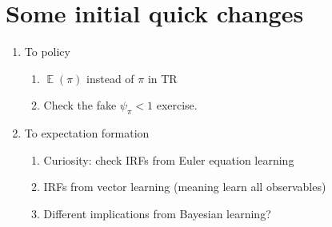 \documentclass[11pt]{article}
\renewcommand{\[}{\begin{equation}}
\renewcommand{\]}{\end{equation}}
\DeclareMathOperator{\E}{\mathbb{E}}
\begin{document}
\section{Some initial quick changes}\label{changes}
\begin{enumerate}
\item To policy
\begin{enumerate}
\item $\E(\pi)$ instead of $\pi$ in TR
\item Check the fake $\psi_{\pi} < 1$ exercise.
\end{enumerate}
\item To expectation formation
\begin{enumerate}
\item Curiosity: check IRFs from Euler equation learning
\item IRFs from vector learning (meaning learn all observables)
\item Different implications from Bayesian learning?
\end{enumerate}
\end{enumerate}
\end{document}
